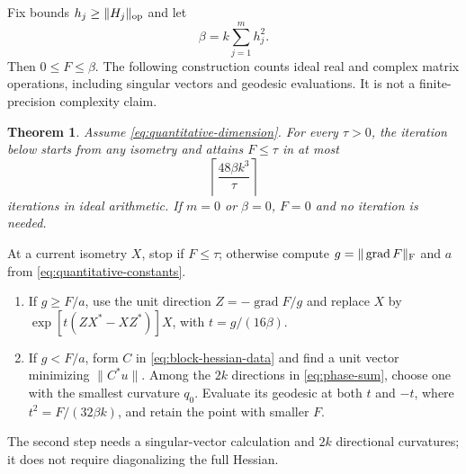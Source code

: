 \documentclass[11pt]{article}
\newtheorem{theorem}{Theorem}[section]
\theoremstyle{remark}
\numberwithin{equation}{section}
\begin{document}
Fix bounds $h_j\ge\|H_j\|_{\rm op}$ and let
\begin{equation}\label{eq:beta}
 \beta=k\sum_{j=1}^m h_j^2.
\end{equation}
Then $0\le F\le\beta$. The following construction counts ideal
real and complex matrix operations, including singular vectors and
geodesic evaluations. It is not a finite-precision complexity claim.

\begin{theorem}\label{thm:iteration}
Assume \eqref{eq:quantitative-dimension}. For every $\tau>0$, the
iteration below starts from any isometry and attains $F\le\tau$
in at most
\begin{equation}\label{eq:iteration-count}
 \left\lceil\frac{48\beta k^3}{\tau}\right\rceil
\end{equation}
iterations in ideal arithmetic. If $m=0$ or $\beta=0$, $F=0$ and
no iteration is needed.
\end{theorem}

At a current isometry $X$, stop if $F\le\tau$; otherwise compute
$g=\|\operatorname{grad}F\|_{\rm F}$ and $a$ from
\eqref{eq:quantitative-constants}.
\begin{enumerate}
\item If $g\ge F/a$, use the unit direction
$Z=-\operatorname{grad}F/g$ and replace $X$ by
$\exp[t(ZX^*-XZ^*)]X$, with $t=g/(16\beta)$.
\item If $g<F/a$, form $C$ in \eqref{eq:block-hessian-data} and
find a unit vector minimizing $\|C^*u\|$. Among the $2k$ directions
in \eqref{eq:phase-sum}, choose one with the smallest curvature $q_0$.
Evaluate its geodesic at both $t$ and $-t$, where
$t^2=F/(32\beta k)$, and retain the point with smaller $F$.
\end{enumerate}
The second step needs a singular-vector calculation and $2k$ directional
curvatures; it does not require diagonalizing the full Hessian.
\end{document}
